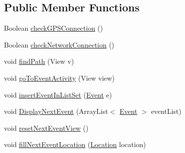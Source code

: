 \subsection*{Public Member Functions}
\begin{DoxyCompactItemize}
\item 
Boolean \hyperlink{classcom_1_1agenda_1_1ter_1_1smartgenda_1_1_calendar_activity_a3adb59a59e9f212fab8c37550a2f49b2}{check\-G\-P\-S\-Connection} ()
\item 
Boolean \hyperlink{classcom_1_1agenda_1_1ter_1_1smartgenda_1_1_calendar_activity_af0b31e941b12eba7fb16d2f128446aad}{check\-Network\-Connection} ()
\item 
void \hyperlink{classcom_1_1agenda_1_1ter_1_1smartgenda_1_1_calendar_activity_a7a6c0453d4f5043d7398157f464151d6}{find\-Path} (View v)
\item 
void \hyperlink{classcom_1_1agenda_1_1ter_1_1smartgenda_1_1_calendar_activity_ab12bb5b32ab322e7f417b237011ebc57}{go\-To\-Event\-Activity} (View view)
\item 
void \hyperlink{classcom_1_1agenda_1_1ter_1_1smartgenda_1_1_calendar_activity_a5ab53d74e4776a8d57b935ab5f0f6d58}{insert\-Event\-In\-List\-Set} (\hyperlink{classcom_1_1agenda_1_1ter_1_1model_1_1_event}{Event} e)
\item 
void \hyperlink{classcom_1_1agenda_1_1ter_1_1smartgenda_1_1_calendar_activity_afc2cbebbf62a00c4ddf304f97ebb0205}{Display\-Next\-Event} (Array\-List$<$ \hyperlink{classcom_1_1agenda_1_1ter_1_1model_1_1_event}{Event} $>$ event\-List)
\item 
void \hyperlink{classcom_1_1agenda_1_1ter_1_1smartgenda_1_1_calendar_activity_a004c91a7bda1e9c25ce922abc9ae8097}{reset\-Next\-Event\-View} ()
\item 
void \hyperlink{classcom_1_1agenda_1_1ter_1_1smartgenda_1_1_calendar_activity_a29556415a739b800eb8a5961ae30a5e4}{fill\-Next\-Event\-Location} (\hyperlink{classcom_1_1agenda_1_1ter_1_1model_1_1_location}{Location} location)
\end{DoxyCompactItemize}
